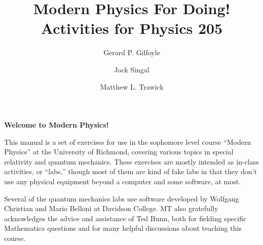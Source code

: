 

\title{Modern Physics For Doing!\\
Activities for Physics 205}

\author{Gerard P. Gilfoyle}
\author{Jack Singal}
\author{Matthew L. Trawick}

\maketitle

\vspace{0.8 in}


\begin{center}
\large{\textbf{Welcome to Modern Physics!}}
\end{center}


This manual is a set of exercises for use in the sophomore level course ``Modern Physics'' at the University of Richmond, covering various topics in special relativity and quantum mechanics.  These exercises are mostly intended as in-class activities, or ``labs,'' though most of them are kind of fake labs in that they don't use any physical equipment beyond a computer and some software, at most.

Several of the quantum mechanics labs use software developed by Wolfgang Christian and Mario Belloni at Davidson College.  MT also gratefully acknowledges the advice and assistance of Ted Bunn, both for fielding specific Mathematica questions and for many helpful discussions about teaching this course.



\newpage
\
\thispagestyle{plain}

\newpage
\
